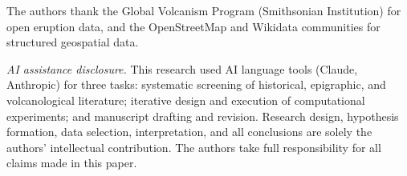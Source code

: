 \documentclass[12pt,a4paper]{article}
\begin{document}
The authors thank the Global Volcanism Program (Smithsonian Institution) for open eruption data, and the OpenStreetMap and Wikidata communities for structured geospatial data.

\textit{AI assistance disclosure.} This research used AI language tools (Claude, Anthropic) for three tasks: systematic screening of historical, epigraphic, and volcanological literature; iterative design and execution of computational experiments; and manuscript drafting and revision. Research design, hypothesis formation, data selection, interpretation, and all conclusions are solely the authors' intellectual contribution. The authors take full responsibility for all claims made in this paper.




\end{document}
